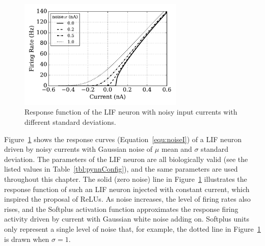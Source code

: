 	\begin{figure}[bt]
		\centering
		\includegraphics[width=0.7\textwidth]{pics_iconip/1.pdf}
		\caption{Response function of the LIF neuron with noisy input currents with different standard deviations.}
		\label{Fig:physics}
	\end{figure}
	
	Figure~\ref{Fig:physics} shows the response curves (Equation~\ref{equ:noiseI}) of a LIF neuron driven by noisy currents with Gaussian noise of $\mu$ mean and $\sigma$ standard deviation.
	The parameters of the LIF neuron are all biologically valid (see the listed values in Table~\ref{tbl:pynnConfig}), and the same parameters are used throughout this chapter.
	The solid (zero noise) line in Figure~\ref{Fig:physics} illustrates the response function of such an LIF neuron injected with constant current, which inspired the proposal of ReLUs.
	As noise increases, the level of firing rates also rises, and the Softplus activation function approximates the response firing activity driven by current with Gaussian white noise adding on.
	Softplus units only represent a single level of noise that, for example, the dotted line in Figure~\ref{Fig:physics} is drawn when $\sigma=1$.
	
